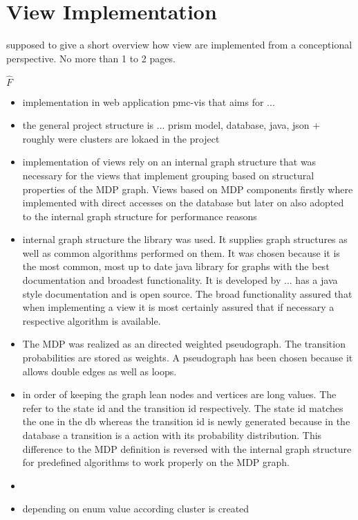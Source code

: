 \documentclass[preview]{standalone}
\begin{document}
\section{View Implementation}
supposed to give a short overview how view are implemented from a conceptional perspective. No more than 1 to 2 pages.

\noindent$\hat{F}$
\begin{itemize}
	\item implementation in web application pmc-vis that aims for ...
	\item the general project structure is ... prism model, database, java, json + roughly were clusters are lokaed in the project
	\item implementation of views rely on an internal graph structure that was necessary for the views that implement grouping based on structural properties of the MDP graph. Views based on MDP components firstly where implemented with direct accesses on the database but later on also adopted to the internal graph structure for performance reasons
	\item internal graph structure the \jgrapht library was used. It supplies graph structures as well as common algorithms performed on them. It was chosen because it is the most common, most up to date java library for graphs with the best documentation and broadest functionality. It is developed by ... has a java style documentation and is open source. The broad functionality assured that when implementing a view it is most certainly assured that if necessary a respective algorithm is available.
	\item The MDP was realized as an directed weighted pseudograph. The transition probabilities are stored as weights. A pseudograph has been chosen because it allows double edges as well as loops.
	\item in order of keeping the graph lean nodes and vertices are long values. The refer to the state id and the transition id respectively. The state id matches the one in the db whereas the transition id is newly generated because in the database a transition is a action with its probability distribution. This difference to the MDP definition is reversed with the internal graph structure for predefined algorithms to work properly on the MDP graph.
	\item {}
	\item depending on enum value according cluster is created

\end{itemize}
\end{document}
